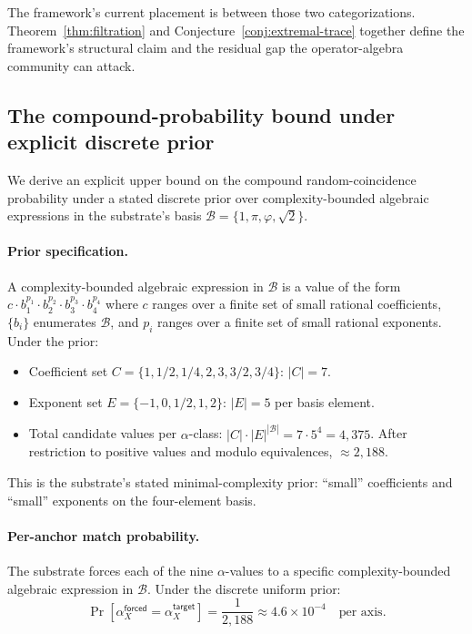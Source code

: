 \documentclass[11pt,a4paper]{amsart}
\theoremstyle{plain}
\theoremstyle{definition}
\begin{document}
The framework's current placement is between those two categorizations. Theorem~\ref{thm:filtration} and Conjecture~\ref{conj:extremal-trace} together define the framework's structural claim and the residual gap the operator-algebra community can attack.

\subsection{The compound-probability bound under explicit discrete prior}\label{subsec:compound-bound-derived}

We derive an explicit upper bound on the compound random-coincidence probability under a stated discrete prior over complexity-bounded algebraic expressions in the substrate's basis $\mathcal{B} = \{1, \pi, \varphi, \sqrt{2}\}$.

\paragraph{Prior specification.} A complexity-bounded algebraic expression in $\mathcal{B}$ is a value of the form $c \cdot b_1^{p_1} \cdot b_2^{p_2} \cdot b_3^{p_3} \cdot b_4^{p_4}$ where $c$ ranges over a finite set of small rational coefficients, $\{b_i\}$ enumerates $\mathcal{B}$, and $p_i$ ranges over a finite set of small rational exponents. Under the prior:
\begin{itemize}[itemsep=2pt,leftmargin=2em]
\item Coefficient set $C = \{1, 1/2, 1/4, 2, 3, 3/2, 3/4\}$: $|C| = 7$.
\item Exponent set $E = \{-1, 0, 1/2, 1, 2\}$: $|E| = 5$ per basis element.
\item Total candidate values per $\alpha$-class: $|C| \cdot |E|^{|\mathcal{B}|} = 7 \cdot 5^4 = 4{,}375$. After restriction to positive values and modulo equivalences, $\approx 2{,}188$.
\end{itemize}
This is the substrate's stated minimal-complexity prior: ``small'' coefficients and ``small'' exponents on the four-element basis.

\paragraph{Per-anchor match probability.} The substrate forces each of the nine $\alpha$-values to a specific complexity-bounded algebraic expression in $\mathcal{B}$. Under the discrete uniform prior:
\[
\Pr[\alpha_X^{\textsf{forced}} = \alpha_X^{\textsf{target}}] = \frac{1}{2{,}188} \approx 4.6 \times 10^{-4} \quad \text{per axis}.
\]
\end{document}
